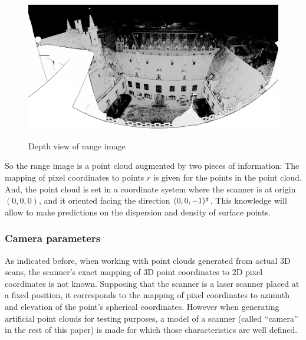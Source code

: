 \begin{figure}[p]
\center
\includegraphics[width=.8\textwidth]{fig/hdv_033_range.jpg}
\label{fig:hdv_033_range}
\caption{Depth view of range image}
\end{figure}

So the range image is a point cloud augmented by two pieces of information: The mapping of pixel coordinates to points $r$ is given for the points in the point cloud. And, the point cloud is set in a coordinate system where the scanner is at origin $(0, 0, 0)$, and it oriented facing the direction $(0, 0, -1)^\intercal$. This knowledge will allow to make predictions on the dispersion and density of surface points.

\subsubsection{Camera parameters}
As indicated before, when working with point clouds generated from actual 3D scans, the scanner's exact mapping of 3D point coordinates to 2D pixel coordinates is not known. Supposing that the scanner is a laser scanner placed at a fixed position, it corresponds to the mapping of pixel coordinates to azimuth and elevation of the point's spherical coordinates. However when generating artificial point clouds for testing purposes, a model of a scanner (called ``camera'' in the rest of this paper) is made for which those characteristics are well defined.

